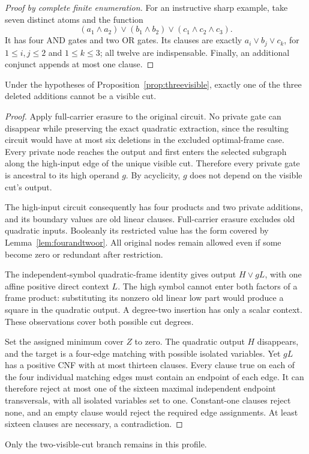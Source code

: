 \begin{proof}[Proof by complete finite enumeration]
For an instructive sharp example, take seven distinct atoms and the function
\[
 (a_1\wedge a_2)\vee(b_1\wedge b_2)
       \vee(c_1\wedge c_2\wedge c_3).
\]
It has four AND gates and two OR gates. Its clauses are exactly
$a_i\vee b_j\vee c_k$, for $1\le i,j\le2$ and $1\le k\le3$; all twelve are indispensable. Finally, an additional conjunct appends at most one clause.
\end{proof}

\begin{proposition}\label{prop:onevisible}
Under the hypotheses of Proposition~\ref{prop:threevisible}, exactly one of the three deleted additions cannot be a visible cut.
\end{proposition}
\begin{proof}
Apply full-carrier erasure to the original circuit. No private gate can disappear while preserving the exact quadratic extraction, since the resulting circuit would have at most six deletions in the excluded optimal-frame case. Every private node reaches the output and first enters the selected subgraph along the high-input edge of the unique visible cut. Therefore every private gate is ancestral to its high operand $g$. By acyclicity, $g$ does not depend on the visible cut's output.

The high-input circuit consequently has four products and two private additions, and its boundary values are old linear clauses. Full-carrier erasure excludes old quadratic inputs. Booleanly its restricted value has the form covered by Lemma~\ref{lem:fourandtwoor}. All original nodes remain allowed even if some become zero or redundant after restriction.

The independent-symbol quadratic-frame identity gives output $H\vee gL$, with one affine positive direct context $L$. The high symbol cannot enter both factors of a frame product: substituting its nonzero old linear low part would produce a square in the quadratic output. A degree-two insertion has only a scalar context. These observations cover both possible cut degrees.

Set the assigned minimum cover $Z$ to zero. The quadratic output $H$ disappears, and the target is a four-edge matching with possible isolated variables. Yet $gL$ has a positive CNF with at most thirteen clauses. Every clause true on each of the four individual matching edges must contain an endpoint of each edge. It can therefore reject at most one of the sixteen maximal independent endpoint transversals, with all isolated variables set to one. Constant-one clauses reject none, and an empty clause would reject the required edge assignments. At least sixteen clauses are necessary, a contradiction.
\end{proof}

Only the two-visible-cut branch remains in this profile.
